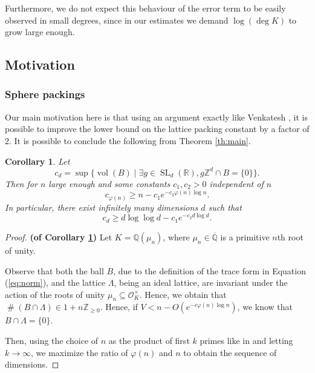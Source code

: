 \documentclass[a4paper]{article}
\newtheorem{corollary}[theorem]{Corollary}
\theoremstyle{definition}
\theoremstyle{remark}
\DeclareMathOperator{\SL}{SL}
\DeclareMathOperator{\vol}{vol}
\DeclareMathOperator{\card}{\#}
\newcommand{\OK}{\mathcal{O}_K}
\begin{document}
Furthermore, we do not expect this behaviour of the error term to be easily observed
in small degrees, since in our estimates we demand $\log (\deg K)$ to grow large enough. 


\subsection*{Motivation}

\subsubsection*{Sphere packings}

Our main motivation here is that using an argument exactly like Venkatesh \cite{AV}, it is possible to improve the lower bound on the lattice packing constant by a factor of $2$.
It is possible to conclude the following from Theorem \ref{th:main}.
\begin{corollary}
\label{co:improv}
Let 
\begin{equation}
c_d = \sup \{\vol(B) \mid \exists g \in \SL_d(\mathbb{R}), g \mathbb{Z}^{d} \cap B = \{0\} \}.
\end{equation}
Then
for $n$ large enough and some constants $c_{1},c_{2}>0$ independent of $n$
\begin{equation}
	c_{\varphi(n) } \geq n - c_{1} e^{- c_{2} \varphi(n) \log n} .
\end{equation}
In particular, there exist infinitely many dimensions $d$ such that 
\begin{equation}
c_d \geq d \log \log d - 
c_{1} e^{-c_{2} d \log d }.
\end{equation}
\end{corollary}

 

\begin{proof} {\bf (of Corollary \ref{co:improv})}
Let $K = \mathbb{Q}(\mu_n)$, where $\mu_{n} \in \overline{\mathbb{Q}}$ is a primitive $n$th root of unity. 

Observe that both the ball $B$, due to the definition of the trace form in Equation (\ref{eq:norm}), and the lattice $\Lambda$, being an ideal lattice, are invariant under the action of the roots of unity $\mu_n \subseteq \OK^{\times}$. 
Hence, we obtain that $\card (B \cap \Lambda )\in 1 + n \mathbb{Z}_{\geq 0}$. Hence, if $V < n - O(e^{-c \varphi(n) \log n})$, we know that $B \cap \Lambda = \{0\}$.

Then, using the choice of $n$ as the product of first $k$ primes like in \cite{AV}
and letting $k \rightarrow \infty$, we maximize the ratio of $\varphi(n)$ and $n$ to obtain the sequence of dimensions.
\end{proof}
\end{document}
